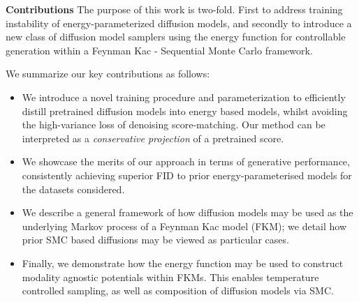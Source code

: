 \textbf{Contributions}
The purpose of this work is two-fold. First to address training instability of energy-parameterized diffusion models, and secondly to introduce a new class of diffusion model samplers using the energy function for controllable generation within a Feynman Kac - Sequential Monte Carlo framework.

We summarize our key contributions as follows:
\begin{itemize}
\item We introduce a novel training procedure and parameterization to efficiently distill pretrained diffusion models into energy based models, whilst avoiding the high-variance loss of denoising score-matching. Our method can be interpreted as a \textit{conservative projection} of a pretrained score.
\item We showcase the merits of our approach in terms of generative performance, consistently achieving superior FID to prior energy-parameterised models for the datasets considered.
\item We describe a general framework of how diffusion models may be used as the underlying Markov process of a Feynman Kac model (FKM); we detail how prior SMC based diffusions may be viewed as particular cases.
\item Finally, we demonstrate how the energy function may be used to construct modality agnostic potentials within FKMs. This enables temperature controlled sampling, as well as composition of diffusion models via SMC. 
\end{itemize}
